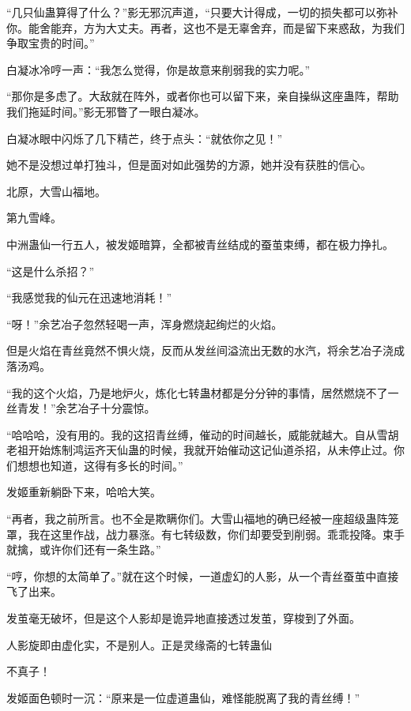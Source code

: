 
\begin{this_body}



“几只仙蛊算得了什么？”影无邪沉声道，“只要大计得成，一切的损失都可以弥补你。能舍能弃，方为大丈夫。再者，这也不是无辜舍弃，而是留下来惑敌，为我们争取宝贵的时间。”

白凝冰冷哼一声：“我怎么觉得，你是故意来削弱我的实力呢。”

“那你是多虑了。大敌就在阵外，或者你也可以留下来，亲自操纵这座蛊阵，帮助我们拖延时间。”影无邪瞥了一眼白凝冰。

白凝冰眼中闪烁了几下精芒，终于点头：“就依你之见！”

她不是没想过单打独斗，但是面对如此强势的方源，她并没有获胜的信心。

北原，大雪山福地。

第九雪峰。

中洲蛊仙一行五人，被发姬暗算，全都被青丝结成的蚕茧束缚，都在极力挣扎。

“这是什么杀招？”

“我感觉我的仙元在迅速地消耗！”

“呀！”余艺冶子忽然轻喝一声，浑身燃烧起绚烂的火焰。

但是火焰在青丝竟然不惧火烧，反而从发丝间溢流出无数的水汽，将余艺冶子浇成落汤鸡。

“我的这个火焰，乃是地炉火，炼化七转蛊材都是分分钟的事情，居然燃烧不了一丝青发！”余艺冶子十分震惊。

“哈哈哈，没有用的。我的这招青丝缚，催动的时间越长，威能就越大。自从雪胡老祖开始炼制鸿运齐天仙蛊的时候，我就开始催动这记仙道杀招，从未停止过。你们想想也知道，这得有多长的时间。”

发姬重新躺卧下来，哈哈大笑。

“再者，我之前所言。也不全是欺瞒你们。大雪山福地的确已经被一座超级蛊阵笼罩，我在这里作战，战力暴涨。有七转级数，你们却要受到削弱。乖乖投降。束手就擒，或许你们还有一条生路。”

“哼，你想的太简单了。”就在这个时候，一道虚幻的人影，从一个青丝蚕茧中直接飞了出来。

发茧毫无破坏，但是这个人影却是诡异地直接透过发茧，穿梭到了外面。

人影旋即由虚化实，不是别人。正是灵缘斋的七转蛊仙

不真子！

发姬面色顿时一沉：“原来是一位虚道蛊仙，难怪能脱离了我的青丝缚！”


\end{this_body}
